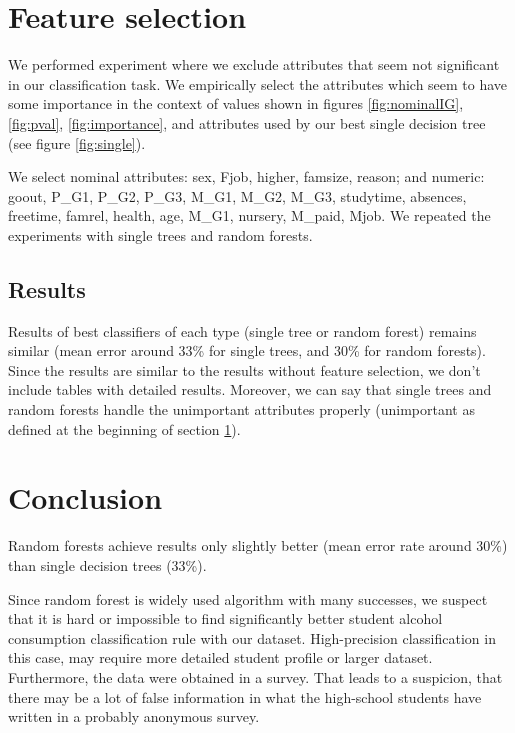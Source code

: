 \documentclass[a4paper]{article}
\begin{document}
\section{Feature selection}
\label{featSel}
We performed experiment where we exclude attributes that
seem not significant in our classification task.
We empirically select the attributes which seem to have some importance in the context of
values shown in figures \ref{fig:nominalIG}, \ref{fig:pval}, \ref{fig:importance},
and attributes used by our best single decision tree (see figure \ref{fig:single}).

We select nominal attributes:
sex,
Fjob,
higher,
famsize,
reason; and numeric:
goout,
P\_G1,
P\_G2,
P\_G3,
M\_G1,
M\_G2,
M\_G3,
studytime,
absences,
freetime,
famrel,
health,
age,
M\_G1,
nursery,
M\_paid,
Mjob.
We repeated the experiments with single trees and random forests.

\subsection{Results}

Results of best classifiers of each type (single tree or random forest) remains similar 
(mean error around 33\% for single trees, and 30\% for random forests).
Since the results are similar to the results without feature selection,
we don't include tables with detailed results.
Moreover, we can say that single trees and random forests handle
the unimportant attributes properly (unimportant as defined at the beginning of section \ref{featSel}).



\section{Conclusion}
Random forests achieve results only slightly better (mean error rate around 30\%)
than single decision trees (33\%).

Since random forest is widely used algorithm with many successes, we suspect
that it is hard or impossible to find significantly better
student alcohol consumption classification rule
with our dataset.
High-precision classification in this case, may require more detailed
student profile or larger dataset.
Furthermore, the data were obtained in a survey.
That leads to a suspicion, that there may be a lot of false information in
what the high-school students have written in a probably anonymous survey.

\end{document}
